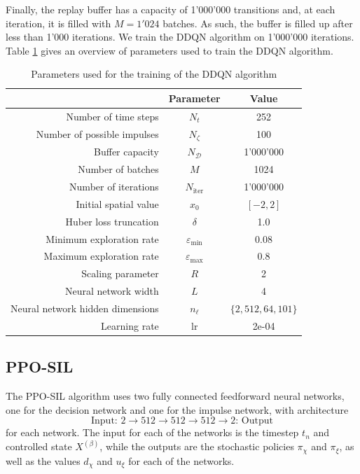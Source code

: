 Finally, the replay buffer has a capacity of 1'000'000 transitions and, at each iteration, it is filled with $M=1'024$ batches. As such, the buffer is filled up after less than 1'000 iterations. We train the DDQN algorithm on 1'000'000 iterations. Table \ref{tab: DDQN training parameters} gives an overview of parameters used to train the DDQN algorithm.
\begin{table}[h]
    \centering
    \begin{tabular}{rcc}
        \toprule
        & Parameter & Value \\
        \hline
        Number of time steps & $N_t$ & 252 \\
        Number of possible impulses & $N_\zeta$ & 100 \\
        Buffer capacity & $N_\mathcal{D}$ & 1'000'000\\
        Number of batches & $M$ & 1024 \\
        Number of iterations & $N_{\text{iter}}$ & 1'000'000 \\
        Initial spatial value & $x_0$ & $[-2,2]$ \\
        Huber loss truncation & $\delta$ & 1.0 \\
        Minimum exploration rate & $\varepsilon_{\min} $ & 0.08 \\
        Maximum exploration rate & $\varepsilon_{\max}$ & 0.8 \\
        Scaling parameter & $R$ & 2 \\
        Neural network width & $L$ & 4 \\
        Neural network hidden dimensions & $n_\ell$ & $\{2, 512, 64, 101\}$ \\
        Learning rate & lr & 2e-04 \\
        \toprule
    \end{tabular}
    \caption{Parameters used for the training of the DDQN algorithm}
    \label{tab: DDQN training parameters}
\end{table}

\subsection{PPO-SIL}
The PPO-SIL algorithm uses two fully connected feedforward neural networks, one for the decision network and one for the impulse network, with architecture
\begin{equation*}
    \text{Input: }2 \rightarrow 512 \rightarrow 512 \rightarrow 512 \rightarrow 2 \text{: Output}
\end{equation*}
for each network. The input for each of the networks is the timestep $t_n$ and controlled state $X^{(\beta)}$, while the outputs are the stochastic policies $\pi_\chi$ and $\pi_\xi$, as well as the values $d_\chi$ and $u_\xi$ for each of the networks. 

